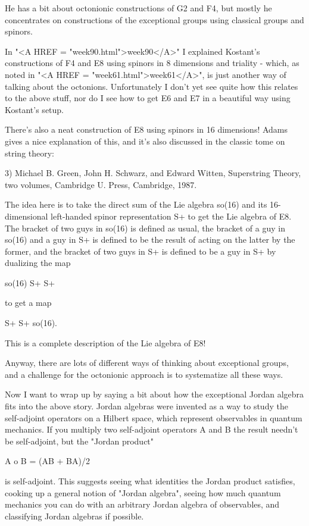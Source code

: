 He has a bit about octonionic constructions of G2 and F4, but mostly he
concentrates on constructions of the exceptional groups using classical
groups and spinors.  

In "<A HREF = "week90.html">week90</A>" I explained Kostant's constructions of F4 and E8 using
spinors in 8 dimensions and triality - which, as noted in "<A HREF = "week61.html">week61</A>",
is just another way of talking about the octonions.  Unfortunately I
don't yet see quite how this relates to the above stuff, nor do I see
how to get E6 and E7 in a beautiful way using Kostant's setup. 

There's also a neat construction of E8 using spinors in 16 dimensions!
Adams gives a nice explanation of this, and it's also discussed in the
classic tome on string theory:

3) Michael B. Green, John H. Schwarz, and Edward Witten, Superstring
Theory, two volumes, Cambridge U. Press, Cambridge, 1987.

The idea here is to take the direct sum of the Lie algebra so(16) and
its 16-dimensional left-handed spinor representation S+ to get the
Lie algebra of E8.  The bracket of two guys in so(16) is defined as
usual, the bracket of a guy in so(16) and a guy in S+ is defined to
be the result of acting on the latter by the former, and the bracket
of two guys in S+ is defined to be a guy in S+ by dualizing the 
map 

so(16) \otimes  S+ \to  S+ 

to get a map 

S+ \otimes  S+ \to  so(16).

This is a complete description of the Lie algebra of E8!  

Anyway, there are lots of different ways of thinking about exceptional
groups, and a challenge for the octonionic approach is to systematize
all these ways.

Now I want to wrap up by saying a bit about how the exceptional Jordan
algebra fits into the above story.  Jordan algebras were invented as a
way to study the self-adjoint operators on a Hilbert space, which
represent observables in quantum mechanics.  If you multiply two
self-adjoint operators A and B the result needn't be self-adjoint, but
the "Jordan product"

A o B = (AB + BA)/2  

is self-adjoint.  This suggests seeing what identities the Jordan
product satisfies, cooking up a general notion of "Jordan algebra",
seeing how much quantum mechanics you can do with an arbitrary Jordan
algebra of observables, and classifying Jordan algebras if possible.

